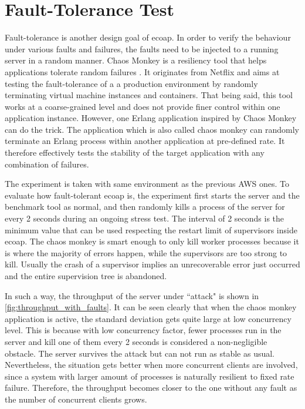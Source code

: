 \section{Fault-Tolerance Test}

Fault-tolerance is another design goal of ecoap. In order to verify the behaviour under various faults and failures, the faults need to be injected to a running server in a random manner. Chaos Monkey is a resiliency tool that helps applications tolerate random failures \autocite{chaos_monkey_netflix}. It originates from Netflix and aims at testing the fault-tolerance of a a production environment by randomly terminating virtual machine instances and containers. That being said, this tool works at a coarse-grained level and does not provide finer control within one application instance. However, one Erlang application inspired by Chaos Monkey can do the trick. The application which is also called chaos monkey \autocite{chaos_monkey_erl} can randomly terminate an Erlang process within another application at pre-defined rate. It therefore effectively tests the stability of the target application with any combination of failures. 

The experiment is taken with same environment as the previous AWS ones. To evaluate how fault-tolerant ecoap is, the experiment first starts the server and the benchmark tool as normal, and then randomly kills a process of the server for every 2 seconds during an ongoing stress test. The interval of 2 seconds is the minimum value that can be used respecting the restart limit of supervisors inside ecoap. The chaos monkey is smart enough to only kill worker processes because it is where the majority of errors happen, while the supervisors are too strong to kill. Usually the crash of a supervisor implies an unrecoverable error just occurred and the entire supervision tree is abandoned. 

In such a way, the throughput of the server under ``attack" is shown in \autoref{fig:throughput_with_faults}. It can be seen clearly that when the chaos monkey application is active, the standard deviation gets quite large at low concurrency level. This is because with low concurrency factor, fewer processes run in the server and kill one of them every 2 seconds is considered a non-negligible obstacle. The server survives the attack but can not run as stable as usual. Nevertheless, the situation gets better when more concurrent clients are involved, since a system with larger amount of processes is naturally resilient to fixed rate failure. Therefore, the throughput becomes closer to the one without any fault as the number of concurrent clients grows. 

